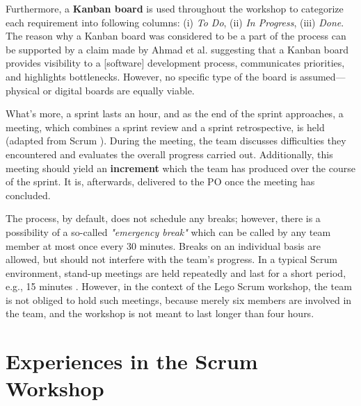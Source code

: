 \documentclass[conference]{IEEEtran}
\begin{document}
Furthermore, a \textbf{Kanban board} is used throughout the workshop to
categorize each requirement into following columns: (i) \textit{To Do}, (ii)
\textit{In Progress}, (iii) \textit{Done}. The reason why a Kanban board was
considered to be a part of the process can be supported by a claim made by
Ahmad et al. \cite{Ahmad2014} suggesting that a Kanban board provides
visibility to a [software] development process, communicates priorities, and
highlights bottlenecks. However, no specific type of the board is
assumed---physical or digital boards are equally viable.

What's more, a sprint lasts an hour, and as the end of the sprint approaches, a
meeting, which combines a sprint review and a sprint retrospective, is held
(adapted from Scrum \cite{Schwaber2020}). During the meeting, the team
discusses difficulties they encountered and evaluates the overall progress
carried out. Additionally, this meeting should yield an \textbf{increment}
which the team has produced over the course of the sprint. It is, afterwards,
delivered to the PO once the meeting has concluded.

The process, by default, does not schedule any breaks; however, there is a
possibility of a so-called \textit{"emergency break"} which can be called by any
team member at most once every 30 minutes. Breaks on an individual basis are
allowed, but should not interfere with the team's progress. In a typical Scrum
environment, stand-up meetings are held repeatedly and last for a short period,
e.g., 15 minutes \cite{Schwaber2020}. However, in the context of the Lego Scrum
workshop, the team is not obliged to hold such meetings, because merely six
members are involved in the team, and the workshop is not meant to last longer
than four hours.

\section{Experiences in the Scrum Workshop}
\label{sec:experiences}

\end{document}
